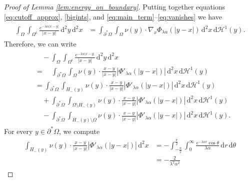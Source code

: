 \documentclass[11pt]{article}
\numberwithin{statement}{section}
\numberwithin{equation}{section}
\theoremstyle{remark}
\newcommand{\intd}{\, \mathrm{d}} 				%
\newcommand{\Hd}{\mathcal H}				%
\newcommand{\stcomp}[1]{{#1}^{\mathsf{c}}}		%
\begin{document}
\begin{proof}[Proof of Lemma \ref{lem:energy_on_boundary}]
    Putting together equations \eqref{eq:cutoff_approx},
    \eqref{bigints}, and \eqref{eq:main_term}--\eqref{eq:vanishes} we
    have
	\begin{align}
	  \begin{split}
            \int_{\Omega} \int_{\stcomp{\Omega}} \frac{e^{-\lambda
                \alpha |x-y|}}{|x-y|} \intd^2 y \intd^2 x
            & = \int_{\partial^* \Omega} \int_{\Omega} \nu(y) \cdot
            \nabla_x \Phi_{\lambda \alpha}(|y-x|)\intd^2 x \intd
            \Hd^1(y).
	  \end{split}
	\end{align}
	Therefore, we can write
	\begin{align}\label{eq:splitup}
	  \begin{split}
            & \quad - \int_{\Omega} \int_{\stcomp{\Omega}}
            \frac{e^{-\lambda \alpha |x-y|}}{|x-y|} \intd^2 y  \intd^2
            x  \\ 
            & =  \quad  \int_{\partial^* \Omega}  \int_{\Omega} \nu(y)
            \cdot \frac{ x-y}{|x-y|}  |\Phi'_{\lambda
              \alpha}(|y-x|)|\intd^2 x \intd \Hd^1(y) \\ 
            & = \int_{\partial^* \Omega}  \int_{H_-(y)} \nu(y) \cdot
            \frac{ x-y}{|x-y|}  |\Phi'_{\lambda \alpha}(|y-x|)|\intd^2
            x \intd \Hd^1(y) \\ 
            & \quad + \int_{\partial^* \Omega}  \int_{\Omega\setminus
              H_-(y)} \nu(y) \cdot \frac{ x-y}{|x-y|}  |\Phi'_{\lambda
              \alpha}(|y-x|)|\intd^2 x \intd \Hd^1(y) \\ 
            & \quad -\int_{\partial^* \Omega} \int_{H_-(y) \setminus
              \Omega} \nu(y) \cdot \frac{ x-y}{|x-y|} |\Phi'_{\lambda
              \alpha}(|y-x|)|\intd^2 x \intd \Hd^1(y).
	  \end{split}
	\end{align}
	For every $y \in \partial^* \Omega$, we compute
	\begin{align}
	  \begin{split}
            \int_{H_-(y)} \nu(y) \cdot \frac{ x-y}{|x-y|}
            |\Phi'_{\lambda \alpha}(|y-x|)|\intd^2 x & =
            -\int_{-\frac{\pi}{2}}^{\frac{\pi}{2}} \int_0^\infty
            \frac{e^{-\lambda \alpha r} \cos
                \theta}{\lambda \alpha} \intd r \intd \theta \\
              & = -\frac{2}{\lambda^2 \alpha^2}
              \label{eq:2lam2al2}
	 \end{split}
	\end{align}

\end{proof}
\end{document}
